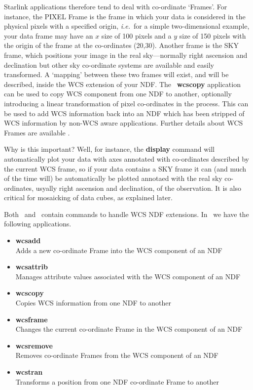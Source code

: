 \documentclass[twoside,11pt]{article}
\newcommand{\htmlref}[2]{#1}
\newcommand{\xref}[3]{#1}
\begin{document}
{Starlink applications therefore tend to deal with co-ordinate
`Frames'.  For instance, the PIXEL Frame is the frame in which your
data is considered in the physical pixels with a specified origin,
\emph{i.e.}\ for a simple two-dimensional example, your data frame may
have an $x$ size of 100 pixels and a $y$ size of 150 pixels with the
origin of the frame at the co-ordinates (20,30).  Another frame is the
SKY frame, which positions your image in the real sky---normally
right ascension and declination but other sky co-ordinate systems are
available and easily transformed.  A `mapping' between these two
frames will exist, and will be described, inside the WCS extension of
your NDF.  The \KAPPA\ \xref{{\bf wcscopy}}{sun95}{WCSCOPY} application can
be used to copy WCS component from one NDF to another, optionally
introducing a linear transformation of pixel co-ordinates in the
process.  This can be used to add WCS information back into an NDF
which has been stripped of WCS information by non-WCS aware
applications.  Further details about \xref{WCS Frames}{sun95}{se_resdoms} 
are available .

Why is this important?  Well, for instance, the
\xref{{\bf display}}{sun95}{DISPLAY} command will automatically plot your
data with axes annotated with co-ordinates described by the current
WCS frame, so if your data contains a SKY frame it can (and much of
the time will) be automatically be plotted annotaed with the real sky
co-ordinates, usyally right ascension and declination, of the
observation.  It is also critical for mosaicking of data cubes, as
explained \htmlref{later}{sc16_mos}.

Both \KAPPAref\ and \CCDPACKref\ contain commands to handle WCS NDF
extensions.  In \KAPPA\ we have the following applications.

\begin{itemize}  
\item{\xref{{\bf wcsadd}}{sun95}{WCSADD}}\\
Adds a new co-ordinate Frame into the WCS component of an NDF 
\item{\xref{{\bf wcsattrib}}{sun95}{WCSATTRIB}}\\
Manages attribute values associated with the WCS component of an NDF
\item{\xref{{\bf wcscopy}}{sun95}{WCSCOPY}}\\ 
Copies WCS information from one NDF to another 
\item{\xref{{\bf wcsframe}}{sun95}{WCSFRAME}}\\ 
Changes the current co-ordinate Frame in the WCS component of an NDF 
\item{\xref{{\bf wcsremove}}{sun95}{WCSREMOVE}}\\
Removes co-ordinate Frames from the WCS component of an NDF 
\item{\xref{{\bf wcstran}}{sun95}{WCSTRAN}}\\
Transforms a position from one NDF co-ordinate Frame to another 
\end{itemize}

}
\end{document}
